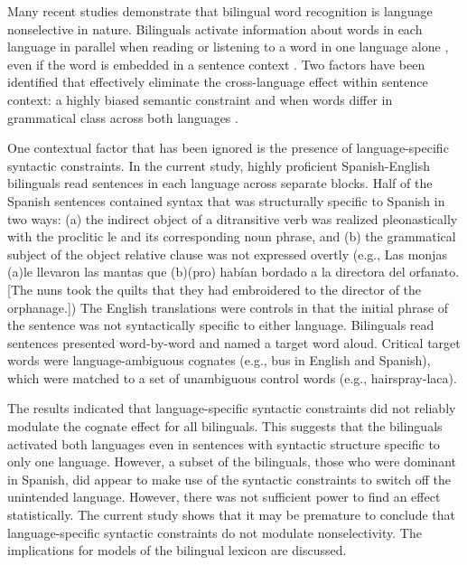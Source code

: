 Many recent studies demonstrate that bilingual word recognition is language nonselective in nature. Bilinguals activate information about words in each language in parallel when reading or listening to a word in one language alone \parencite[e.g.,][]{Dijkstra2005,Marian2003}, even if the word is embedded in a sentence context \parencite[e.g.,][]{Duyck2007, Libben2009, Schwartz2006,VanHell2008}. Two factors have been identified that effectively eliminate the cross-language effect within sentence context: a highly biased semantic constraint \parencite[e.g.,][]{Schwartz2006} and when words differ in grammatical class across both languages \parencite[e.g.,][]{Baten2010}.

One contextual factor that has been ignored is the presence of language-specific syntactic constraints. In the current study, highly proficient Spanish-English bilinguals read sentences in each language across separate blocks. Half of the Spanish sentences contained syntax that was structurally specific to Spanish in two ways: (a) the indirect object of a ditransitive verb was realized pleonastically with the proclitic le and its corresponding noun phrase, and (b) the grammatical subject of the object relative clause was not expressed overtly (e.g., Las monjas (a)le llevaron las mantas que (b)(pro) hab\'{i}an bordado a la directora del orfanato. [The nuns took the quilts that they had embroidered to the director of the orphanage.]) The English translations were controls in that the initial phrase of the sentence was not syntactically specific to either language. Bilinguals read sentences presented word-by-word and named a target word aloud. Critical target words were language-ambiguous cognates (e.g., bus in English and Spanish), which were matched to a set of unambiguous control words (e.g., hairspray-laca).

The results indicated that language-specific syntactic constraints did not reliably modulate the cognate effect for all bilinguals. This suggests that the bilinguals activated both languages even in sentences with syntactic structure specific to only one language. However, a subset of the bilinguals, those who were dominant in Spanish, did appear to make use of the syntactic constraints to switch off the unintended language. However, there was not sufficient power to find an effect statistically. The current study shows that it may be premature to conclude that language-specific syntactic constraints do not modulate nonselectivity. The implications for models of the bilingual lexicon are discussed.
